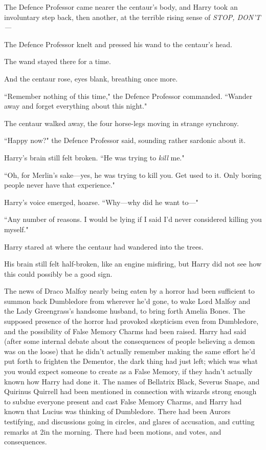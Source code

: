 The Defence Professor came nearer the centaur's body, and Harry took an involuntary step back, then another, at the terrible rising sense of \emph{STOP, DON'T—}

The Defence Professor knelt and pressed his wand to the centaur's head.

The wand stayed there for a time.

And the centaur rose, eyes blank, breathing once more.

``Remember nothing of this time," the Defence Professor commanded. ``Wander away and forget everything about this night."

The centaur walked away, the four horse-legs moving in strange synchrony.

``Happy now?" the Defence Professor said, sounding rather sardonic about it.

Harry's brain still felt broken. ``He was trying to \emph{kill} me."

``Oh, for Merlin's sake—yes, he was trying to kill you. Get used to it. Only boring people never have that experience."

Harry's voice emerged, hoarse. ``Why—why did he want to—"

``Any number of reasons. I would be lying if I said I'd never considered killing you myself."

Harry stared at where the centaur had wandered into the trees.

His brain still felt half-broken, like an engine misfiring, but Harry did not see how this could possibly be a good sign.

\later

The news of Draco Malfoy nearly being eaten by a horror had been sufficient to summon back Dumbledore from wherever he'd gone, to wake Lord Malfoy and the Lady Greengrass's handsome husband, to bring forth Amelia Bones. The supposed presence of the horror had provoked skepticism even from Dumbledore, and the possibility of False Memory Charms had been raised. Harry had said (after some internal debate about the consequences of people believing a demon was on the loose) that he didn't actually remember making the same effort he'd put forth to frighten the Dementor, the dark thing had just left; which was what you would expect someone to create as a False Memory, if they hadn't actually known how Harry had done it. The names of Bellatrix Black, Severus Snape, and Quirinus Quirrell had been mentioned in connection with wizards strong enough to subdue everyone present and cast False Memory Charms, and Harry had known that Lucius was thinking of Dumbledore. There had been Aurors testifying, and discussions going in circles, and glares of accusation, and cutting remarks at 2\am in the morning. There had been motions, and votes, and consequences.


